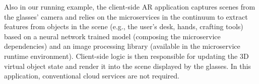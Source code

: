 Also in our running example, the client-side AR application captures scenes from the glasses' camera and relies on the microservices in the continuum to extract features from objects in the scene (e.g., the user's desk, hands, crafting tools) based on a neural network trained model (composing the microservice dependencies) and an image processing library (available in the microservice runtime environment). Client-side logic is then responsible for updating the 3D virtual object state and render it into the scene displayed by the glasses. In this application, conventional cloud services are not required.








